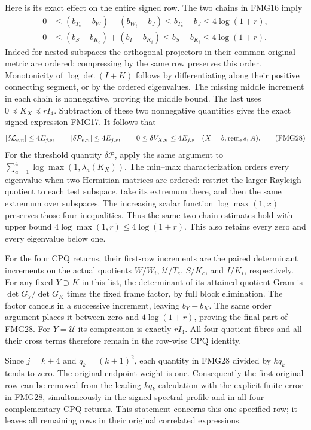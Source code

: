 \documentclass[11pt,a4paper]{article}
\begin{document}
Here is its exact effect on the entire signed row. The two chains
in FMG16 imply
\[
\begin{split}
 0&\le (b_{T_e}-b_W)+(b_{W_i}-b_J)
          \le b_{T_e}-b_J\le4\log(1+r),\\
 0&\le (b_S-b_{K_c})+(b_I-b_{K_i})
          \le b_S-b_{K_i}\le4\log(1+r).
\end{split}                                                     \tag{FMG27}
\]
Indeed for nested subspaces the orthogonal projectors in their
common original metric are ordered; compressing by the same row
preserves this order. Monotonicity of $\log\det(I+K)$ follows
by differentiating along their positive connecting segment, or by
the ordered eigenvalues. The missing middle increment in each
chain is nonnegative, proving the middle bound. The last uses
$0\preceq K_X\preceq rI_4$. Subtraction of these two nonnegative
quantities gives the exact signed expression FMG17. It follows that
\[
 |\delta\mathcal L_{e,n}|\le4E_{j,s},\qquad
 |\delta\mathcal P_{e,n}|\le4E_{j,s},\qquad
 0\le\delta V_{X,n}\le4E_{j,s}
       \quad(X=b,{\rm rem},s,A).                         \tag{FMG28}
\]
For the threshold quantity $\delta\mathcal P$, apply the same
argument to $\sum_{a=1}^4\log\max(1,\lambda_a(K_X))$.
The min--max characterization orders every eigenvalue when two
Hermitian matrices are ordered: restrict the larger Rayleigh
quotient to each test subspace, take its extremum there, and then
the same extremum over subspaces. The increasing scalar function
$\log\max(1,x)$ preserves those four inequalities. Thus the
same two chain estimates hold with upper bound
$4\log\max(1,r)\le4\log(1+r)$. This also retains every zero
and every eigenvalue below one.

For the four CPQ returns, their first-row increments are the paired
determinant increments on the actual quotients
$W/W_i$, $\mathcal U/T_e$, $S/K_c$, and $I/K_i$, respectively.
For any fixed $Y\supset K$ in this list, the determinant of its
attained quotient Gram is $\det G_Y/\det G_K$ times the fixed
frame factor, by full block elimination. The factor cancels in a
successive increment, leaving $b_Y-b_K$. The same order argument
places it between zero and $4\log(1+r)$, proving the final part
of FMG28. For $Y=\mathcal U$ its compression is exactly $rI_4$.
All four quotient fibres and all their cross terms therefore
remain in the row-wise CPQ identity.

Since $j=k+4$ and $q_k=(k+1)^2$, each quantity in FMG28 divided
by $kq_k$ tends to zero. The original endpoint weight is one.
Consequently the first original row can be removed from the
leading $kq_k$ calculation with the explicit finite error in
FMG28, simultaneously in the signed spectral profile and in
all four complementary CPQ returns. This statement concerns this
one specified row; it leaves all remaining rows in their original
correlated expressions.
\end{document}

